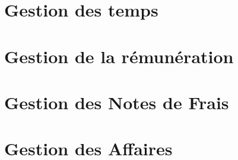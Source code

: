 \documentclass[12pt]{scrreprt}
\begin{document}
\chapter{Gestion des temps}



\chapter{Gestion de la rémunération}

\chapter{Gestion des Notes de Frais}


\chapter{Gestion des Affaires}

% 
\end{document}
